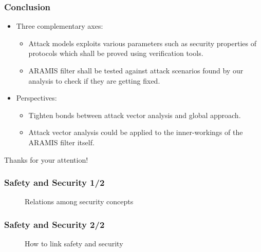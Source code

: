 \documentclass{beamer}
\begin{document}
\begin{frame}
    \frametitle{Conclusion}

    \begin{itemize}
        \item Three complementary axes:
        \begin{itemize}
            \item Attack models exploits various parameters such as security properties of protocols which shall be proved using verification tools.
            \item ARAMIS filter shall be tested against attack scenarios found by our analysis to check if they are getting fixed.
        \end{itemize}
    \end{itemize}

    \begin{itemize}
        \item Perspectives:
        \begin{itemize}
            \item Tighten bonds between attack vector analysis and global approach.
            \item Attack vector analysis could be applied to the inner-workings of the ARAMIS filter itself.
        \end{itemize}
    \end{itemize}
    
    \bigskip
    \begin{center}
        Thanks for your attention!
    \end{center}
\end{frame}

\begin{frame}
    \frametitle{Safety and Security 1/2}

    \begin{figure}[htb]
        \resizebox{\columnwidth}{!}{
            
        }
        \caption{Relations among security concepts}
    \end{figure}
\end{frame}

\begin{frame}
    \frametitle{Safety and Security 2/2}
    
    \begin{figure}[htb]
        \resizebox{.6\columnwidth}{!}{
            
        }
        \caption{How to link safety and security \cite{Pie10}}
    \end{figure}
\end{frame}
\end{document}
